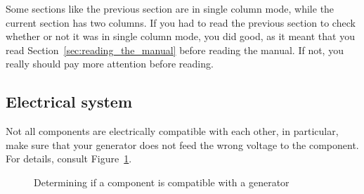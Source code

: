 \documentclass{article}
\begin{document}
    Some sections like the previous section are in single column mode, while the
    current section has two columns. If you had to read the previous section to check
    whether or not it was in single column mode, you did good, as it meant that you
    read Section~\ref{sec:reading_the_manual} before reading the manual. If not,
    you really should pay more attention before reading.

    \onecolumn

    \subsection{Electrical system}

    Not all components are electrically compatible with each other, in particular,
    make sure that your generator does not feed the wrong voltage to the component.
    For details, consult Figure~\ref{fig:generator_flowchart}.

    \begin{figure}
        
        \caption{Determining if a component is compatible with a
        generator}\label{fig:generator_flowchart}
    \end{figure}
\end{document}
